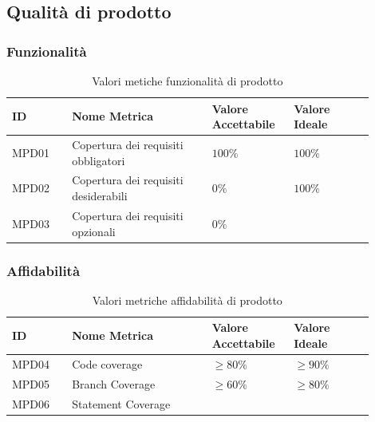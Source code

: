 \documentclass[a4paper,12pt]{article}
\begin{document}
        \subsection{Qualità di prodotto}
            \subsubsection{Funzionalità}
                \begin{longtable}{|M{0.15\linewidth}|M{0.35\linewidth}|M{0.2\linewidth}|M{0.2\linewidth}|}

                    \caption{Valori metiche funzionalità di prodotto} \\
                    \hline
                    \textbf{ID} & \textbf{Nome Metrica} & \textbf{Valore Accettabile} & \textbf{Valore Ideale} \\
                    \hline
                    \endhead

                    MPD01 & Copertura dei requisiti obbligatori & $100\%$ & $100\%$ \\
                    \hline

                    MPD02 & Copertura dei requisiti desiderabili & $0\%$ & $100\%$ \\
                    \hline

                    MPD03 & Copertura dei requisiti opzionali & $0\%$ & \\
                    \hline

                \end{longtable}

            \subsubsection{Affidabilità}
            \begin{longtable}{|M{0.15\linewidth}|M{0.35\linewidth}|M{0.2\linewidth}|M{0.2\linewidth}|}

                \caption{Valori metriche affidabilità di prodotto} \\
                \hline
                \textbf{ID} & \textbf{Nome Metrica} & \textbf{Valore Accettabile} & \textbf{Valore Ideale} \\
                \hline
                \endhead

                    MPD04 & Code coverage & $\ge80\%$ & $\ge90\%$ \\
                    \hline

                    MPD05 & Branch Coverage & $\ge60\%$ & $\ge80\%$ \\
                    \hline

                    MPD06 & Statement Coverage & &  \\
                    \hline

            \end{longtable}
\end{document}
